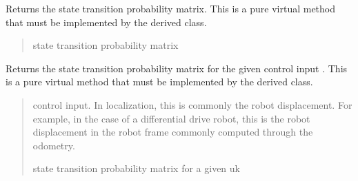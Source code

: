 \documentclass[letterpaper,10pt,english]{sphinxmanual}
\begin{document}
\begin{fulllineitems}
\begin{fulllineitems}
\begin{quote}
\begin{description}
\end{description}\end{quote}

\end{fulllineitems}


\begin{fulllineitems}
\label{\detokenize{HF:HF.HF.StateTransitionProbability}}
\pysigstartsignatures
{}
\pysigstopsignatures
\sphinxAtStartPar
Returns the state transition probability matrix.
This is a pure virtual method that must be implemented by the derived class.
\begin{quote}\begin{description}
\sphinxAtStartPar
{} state transition probability matrix

\end{description}\end{quote}

\end{fulllineitems}


\begin{fulllineitems}
\label{\detokenize{HF:HF.HF.StateTransitionProbability_4_uk}}
\pysigstartsignatures
{}
\pysigstopsignatures
\sphinxAtStartPar
Returns the state transition probability matrix for the given control input .
This is a pure virtual method that must be implemented by the derived class.
\begin{quote}\begin{description}
\sphinxAtStartPar
{} \textendash{} control input. In localization, this is commonly the robot displacement. For example, in the case of a differential drive robot, this is the robot displacement in the robot frame commonly computed through the odometry.

\sphinxAtStartPar
{} state transition probability matrix for a given uk


\end{description}
\end{quote}
\end{fulllineitems}
\end{fulllineitems}
\end{document}
